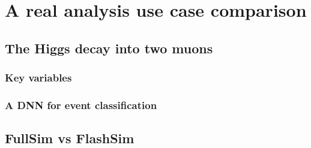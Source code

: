 \chapter{A real analysis use case comparison}\label{ch:benan} %

\section{The Higgs decay into two muons}

\subsection{Key variables}

\subsection{A DNN for event classification}

\section{FullSim vs FlashSim}

